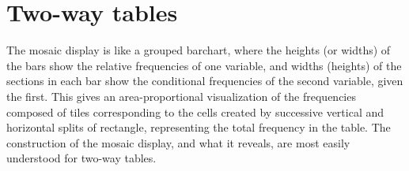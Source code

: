\documentclass[11pt]{book}\usepackage[]{graphicx}\usepackage[]{color}
\begin{document}
\section{Two-way tables}\label{sec:mosaic-twoway}

The mosaic display 
\citep{Friendly:92b,Friendly:94a,Friendly:97,HartiganKleiner:81,HartiganKleiner:84}
is like a grouped barchart,
where the heights (or widths) of the bars show the relative frequencies of one
variable, and widths (heights) of the sections in each bar show the
conditional frequencies of the second variable, given the first.
This gives an area-proportional visualization of the frequencies
composed of tiles corresponding to the cells created by successive
vertical and horizontal splits of rectangle, representing the total
frequency in the table.
The construction of the mosaic display, and what it reveals,
are most easily understood for two-way tables.
\end{document}
